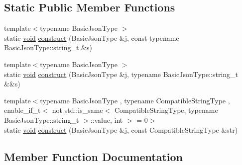 \subsection*{Static Public Member Functions}
\begin{DoxyCompactItemize}
\item 
{\footnotesize template$<$typename Basic\+Json\+Type $>$ }\\static \hyperlink{namespacenlohmann_1_1detail_a59fca69799f6b9e366710cb9043aa77d}{void} \hyperlink{structnlohmann_1_1detail_1_1external__constructor_3_01value__t_1_1string_01_4_ad88d0b4b7ea01ea20e12cc1b82fe0d92}{construct} (Basic\+Json\+Type \&j, const typename Basic\+Json\+Type\+::string\+\_\+t \&s)
\item 
{\footnotesize template$<$typename Basic\+Json\+Type $>$ }\\static \hyperlink{namespacenlohmann_1_1detail_a59fca69799f6b9e366710cb9043aa77d}{void} \hyperlink{structnlohmann_1_1detail_1_1external__constructor_3_01value__t_1_1string_01_4_a74f56b9ca1d4e8db9751353d76668322}{construct} (Basic\+Json\+Type \&j, typename Basic\+Json\+Type\+::string\+\_\+t \&\&s)
\item 
{\footnotesize template$<$typename Basic\+Json\+Type , typename Compatible\+String\+Type , enable\+\_\+if\+\_\+t$<$ not std\+::is\+\_\+same$<$ Compatible\+String\+Type, typename Basic\+Json\+Type\+::string\+\_\+t $>$\+::value, int $>$  = 0$>$ }\\static \hyperlink{namespacenlohmann_1_1detail_a59fca69799f6b9e366710cb9043aa77d}{void} \hyperlink{structnlohmann_1_1detail_1_1external__constructor_3_01value__t_1_1string_01_4_a8822d43f0e20c5a28be329f9ca7de6c4}{construct} (Basic\+Json\+Type \&j, const Compatible\+String\+Type \&str)
\end{DoxyCompactItemize}


\subsection{Member Function Documentation}
\mbox{\label{structnlohmann_1_1detail_1_1external__constructor_3_01value__t_1_1string_01_4_ad88d0b4b7ea01ea20e12cc1b82fe0d92}} 
